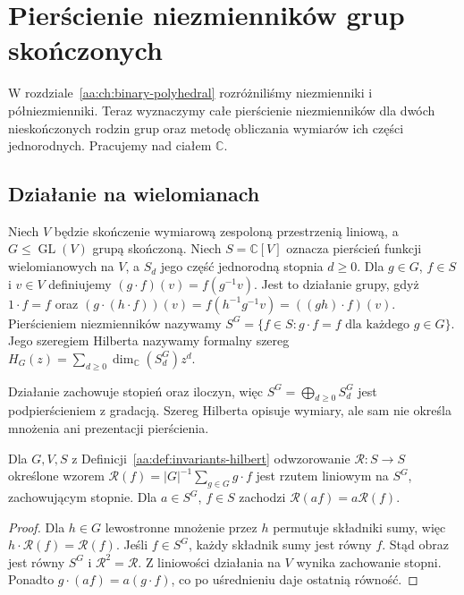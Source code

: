 \chapter{Pierścienie niezmienników grup skończonych}
\label{aa:ch:finite-invariants}
W rozdziale~\ref{aa:ch:binary-polyhedral} rozróżniliśmy
niezmienniki i półniezmienniki. Teraz wyznaczymy
całe pierścienie niezmienników dla dwóch nieskończonych
rodzin grup oraz metodę obliczania wymiarów ich części
jednorodnych. Pracujemy nad ciałem $\mathbb C$.

\section{Działanie na wielomianach}

\begin{definicja}
\label{aa:def:invariants-hilbert}
Niech $V$ będzie skończenie wymiarową zespoloną
przestrzenią liniową, a $G\le\operatorname{GL}(V)$
grupą skończoną. Niech $S=\mathbb C[V]$ oznacza
pierścień funkcji wielomianowych na $V$,
a $S_d$ jego część jednorodną stopnia $d\ge0$.
Dla $g\in G$, $f\in S$ i $v\in V$ definiujemy
$(g\cdot f)(v)=f(g^{-1}v)$. Jest to działanie grupy,
gdyż $1\cdot f=f$ oraz
$(g\cdot(h\cdot f))(v)=f(h^{-1}g^{-1}v)
=((gh)\cdot f)(v)$.
Pierścieniem niezmienników nazywamy
$S^G=\{f\in S:g\cdot f=f\text{ dla każdego }g\in G\}$.
Jego szeregiem Hilberta nazywamy formalny szereg
$H_G(z)=\sum_{d\ge0}\dim_{\mathbb C}(S_d^G)z^d$.
\end{definicja}

Działanie zachowuje stopień oraz iloczyn, więc
$S^G=\bigoplus_{d\ge0}S_d^G$ jest podpierścieniem
z gradacją. Szereg Hilberta opisuje wymiary, ale sam
nie określa mnożenia ani prezentacji pierścienia.

\begin{lemat}
\label{aa:lem:invariants-reynolds}
Dla $G,V,S$ z Definicji~\ref{aa:def:invariants-hilbert}
odwzorowanie $\mathcal R:S\to S$ określone wzorem
$\mathcal R(f)=|G|^{-1}\sum_{g\in G}g\cdot f$
jest rzutem liniowym na $S^G$, zachowującym stopnie.
Dla $a\in S^G$, $f\in S$ zachodzi
$\mathcal R(af)=a\mathcal R(f)$.
\end{lemat}
\begin{proof}
Dla $h\in G$ lewostronne mnożenie przez $h$ permutuje
składniki sumy, więc $h\cdot\mathcal R(f)=\mathcal R(f)$.
Jeśli $f\in S^G$, każdy składnik sumy jest równy $f$.
Stąd obraz jest równy $S^G$ i $\mathcal R^2=\mathcal R$.
Z liniowości działania na $V$ wynika zachowanie stopni.
Ponadto $g\cdot(af)=a(g\cdot f)$, co po uśrednieniu
daje ostatnią równość.
\end{proof}


